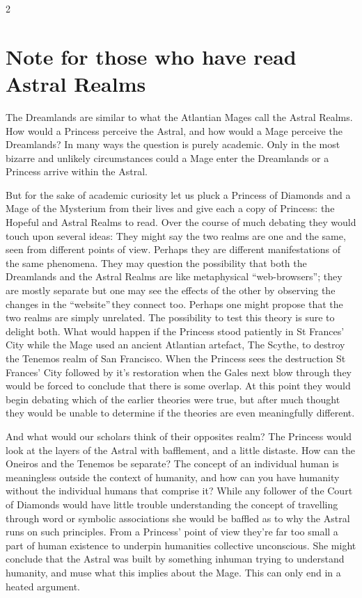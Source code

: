 \begin{multicols}{2}
\section*{Note for those who have read Astral Realms}

The Dreamlands are similar to what the Atlantian Mages call the Astral Realms. How would a Princess perceive the Astral, and how would a Mage perceive the Dreamlands? In many ways the question is purely academic. Only in the most bizarre and unlikely circumstances could a Mage enter the Dreamlands or a Princess arrive within the Astral.

But for the sake of academic curiosity let us pluck a Princess of Diamonds and a Mage of the Mysterium from their lives and give each a copy of Princess: the Hopeful and Astral Realms to read. Over the course of much debating they would touch upon several ideas: They might say the two realms are one and the same, seen from different points of view. Perhaps they are different manifestations of the same phenomena. They may question the possibility that both the Dreamlands and the Astral Realms are like metaphysical \textquotedblleft web-browsers\textquotedblright; they are mostly separate but one may see the effects of the other by observing the changes in the \textquotedblleft website\textquotedblright\,they connect too. Perhaps one might propose that the two realms are simply unrelated. The possibility to test this theory is sure to delight both. What would happen if the Princess stood patiently in St Frances' City while the Mage used an ancient Atlantian artefact, The Scythe, to destroy the Tenemos realm of 
San Francisco. When the Princess sees the destruction St Frances' City followed by it's restoration when the Gales next blow through they would be forced to conclude that there is some overlap. At this point they would begin debating which of the earlier theories were true, but after much thought they would be unable to determine if the theories are even meaningfully different.

And what would our scholars think of their opposites realm? The Princess would look at the layers of the Astral with bafflement, and a little distaste. How can the Oneiros and the Tenemos be separate? The concept of an individual human is meaningless outside the context of humanity, and how can you have humanity without the individual humans that comprise it? While any follower of the Court of Diamonds would have little trouble understanding the concept of travelling through word or symbolic associations she would be baffled as to why the Astral runs on such principles. From a Princess' point of view they're far too small a part of human existence to underpin humanities collective unconscious. She might conclude that the Astral was built by something inhuman trying to understand humanity, and muse what this implies about the Mage. This can only end in a heated argument.


\end{multicols}
